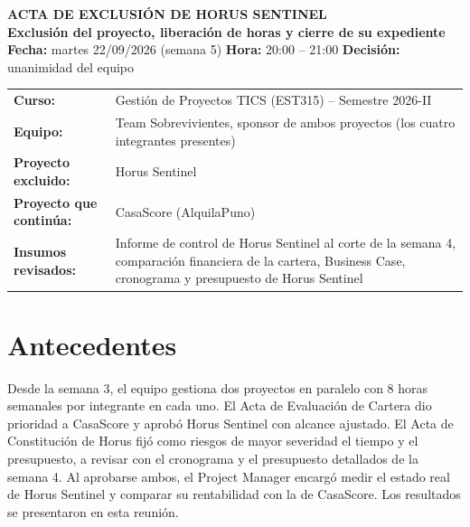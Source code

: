 \documentclass[11pt,a4paper]{article}
\begin{document}
\begin{center}
    {\Large \textbf{\textcolor{AzulUNA}{ACTA DE EXCLUSIÓN DE HORUS SENTINEL}}}\\[3pt]
    {\normalsize \textbf{Exclusión del proyecto, liberación de horas y cierre de su expediente}}\\[4pt]
    \footnotesize \textbf{Fecha:} martes 22/09/2026 (semana 5) \quad \textbar\quad \textbf{Hora:} 20:00 -- 21:00 \quad \textbar\quad \textbf{Decisión:} unanimidad del equipo
\end{center}

\vspace{0.1cm}

\noindent\begin{tabularx}{\textwidth}{@{}P{3.8cm} L@{}}
\toprule
\textbf{Curso:} & Gestión de Proyectos TICS (EST315) -- Semestre 2026-II \\
\textbf{Equipo:} & Team Sobrevivientes, sponsor de ambos proyectos (los cuatro integrantes presentes) \\
\textbf{Proyecto excluido:} & Horus Sentinel \\
\textbf{Proyecto que continúa:} & CasaScore (AlquilaPuno) \\
\textbf{Insumos revisados:} & Informe de control de Horus Sentinel al corte de la semana 4, comparación financiera de la cartera, Business Case, cronograma y presupuesto de Horus Sentinel \\
\bottomrule
\end{tabularx}

\section{Antecedentes}
Desde la semana 3, el equipo gestiona dos proyectos en paralelo con 8 horas semanales por integrante en cada uno. El Acta de Evaluación de Cartera dio prioridad a CasaScore y aprobó Horus Sentinel con alcance ajustado. El Acta de Constitución de Horus fijó como riesgos de mayor severidad el tiempo y el presupuesto, a revisar con el cronograma y el presupuesto detallados de la semana 4. Al aprobarse ambos, el Project Manager encargó medir el estado real de Horus Sentinel y comparar su rentabilidad con la de CasaScore. Los resultados se presentaron en esta reunión.
\end{document}
